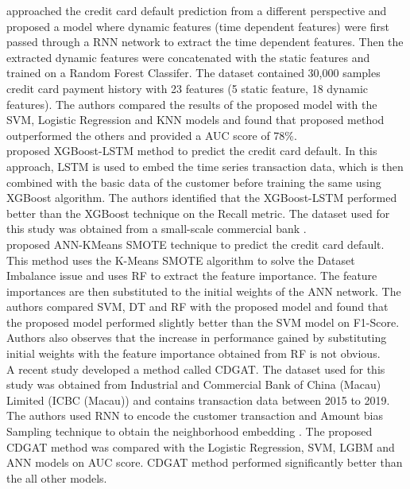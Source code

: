 \documentclass[twoside,11pt,a4paper]{article}
\begin{document}
\citep{hsu2019enhanced} approached the credit card default prediction from a different perspective and proposed a model where dynamic features (time dependent features) were first passed through a \acf{RNN} network to extract the time dependent features. Then the extracted dynamic features were concatenated with the static features and trained on a Random Forest Classifer. The dataset contained 30,000 samples credit card payment history with 23 features (5 static feature, 18 dynamic features)\citep{yeh2009comparisons}. The authors compared the results of the proposed model with the \acs{SVM}, Logistic Regression and \acs{KNN} models and found that proposed method outperformed the others and provided a \acs{AUC} score of 78\%.\\

\citep{gao2021research} proposed \acs{XGBoost}-\acs{LSTM} method to predict the credit card default. In this approach, \acs{LSTM} is used to embed the time series transaction data, which is then combined with the basic data of the customer before training the same using \acs{XGBoost} algorithm. The authors identified that the \acs{XGBoost}-\acs{LSTM} performed better than the \acs{XGBoost} technique on the Recall metric. The dataset used for this study was obtained from a small-scale commercial bank \citep{gao2021research}.\\

\cite{chen2021research} proposed \acs{ANN}-KMeans \acs{SMOTE} technique to predict the credit card default. This method uses the K-Means \acs{SMOTE} algorithm to solve the Dataset Imbalance issue and uses \acs{RF} to extract the feature importance. The feature importances are then substituted to the initial weights of the \acs{ANN} network. The authors compared \acs{SVM}, \acs{DT} and \acs{RF} with the proposed model and found that the proposed model performed slightly better than the \acs{SVM} model on F1-Score. Authors also observes that the increase in performance gained by substituting initial weights with the feature importance obtained from \acs{RF} is not obvious.\\

A recent study \citep{wu2022cdgat} developed a method called \acf{CDGAT}. The dataset used for this study was obtained from  Industrial and Commercial Bank of China (Macau) Limited (ICBC (Macau)) and contains transaction data between 2015 to 2019. The authors used \acs{RNN} to encode the customer transaction  and Amount bias Sampling technique to obtain the neighborhood embedding . The proposed \acs{CDGAT} method was compared with the Logistic Regression, \acs{SVM}, \acs{LGBM} and \acs{ANN}  models on \acs{AUC} score. \acs{CDGAT} method performed significantly better than the all other models. \\
\end{document}
